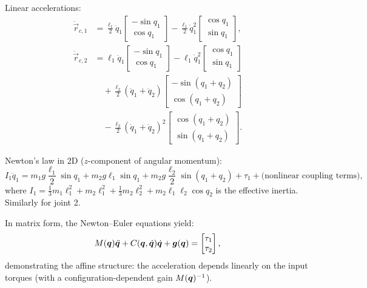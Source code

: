 Linear accelerations:
\begin{align}
\ddot{\vec{r}}_{c,1} &= \frac{\ell_1}{2}\ddot q_1 \begin{bmatrix}-\sin q_1 \\ \cos q_1\end{bmatrix}
- \frac{\ell_1}{2}\dot q_1^2 \begin{bmatrix}\cos q_1 \\ \sin q_1\end{bmatrix}, \\
\ddot{\vec{r}}_{c,2} &= \ell_1\ddot q_1 \begin{bmatrix}-\sin q_1 \\ \cos q_1\end{bmatrix}
- \ell_1\dot q_1^2 \begin{bmatrix}\cos q_1 \\ \sin q_1\end{bmatrix} \\
&\quad + \frac{\ell_2}{2}(\ddot q_1+\ddot q_2) \begin{bmatrix}-\sin(q_1+q_2) \\ \cos(q_1+q_2)\end{bmatrix} \\
&\quad - \frac{\ell_2}{2}(\dot q_1+\dot q_2)^2 \begin{bmatrix}\cos(q_1+q_2) \\ \sin(q_1+q_2)\end{bmatrix}.
\end{align}

Newton's law in 2D ($z$-component of angular momentum):
\begin{equation}
I_1\ddot q_1 = m_1 g \frac{\ell_1}{2}\sin q_1 + m_2 g \ell_1\sin q_1 + m_2 g \frac{\ell_2}{2}\sin(q_1+q_2) + \tau_1
+ \text{(nonlinear coupling terms)},
\end{equation}
where $I_1 = \frac{1}{3}m_1\ell_1^2 + m_2\ell_1^2 + \frac{1}{3}m_2\ell_2^2 + m_2\ell_1\ell_2\cos q_2$ is the
effective inertia. Similarly for joint 2.

In matrix form, the Newton--Euler equations yield:
\begin{equation}
M(\bm{q})\ddot{\bm{q}} + C(\bm{q},\dot{\bm{q}})\dot{\bm{q}} + \bm{g}(\bm{q}) = \begin{bmatrix}\tau_1 \\ \tau_2\end{bmatrix},
\end{equation}
demonstrating the affine structure: the acceleration depends linearly on the input torques
(with a configuration-dependent gain $M(\bm{q})^{-1}$).

